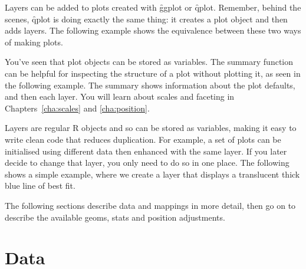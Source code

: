 Layers can be added to plots created with \f{ggplot} or \f{qplot}.  Remember, behind the scenes, \f{qplot} is doing exactly the same thing: it creates a plot object and then adds layers.  The following example shows the equivalence between these two ways of making plots.

% 
% 


You've seen that plot objects can be stored as variables. The summary function can be helpful for inspecting the structure of a plot without plotting it, as seen in the following example.  The summary shows information about the plot defaults, and then each layer. You will learn about scales and faceting in Chapters~\ref{cha:scales} and \ref{cha:position}.

%
%


Layers are regular R objects and so can be stored as variables, making it easy to write clean code that reduces duplication.  For example, a set of plots can be initialised using different data then enhanced with the same layer.  If you later decide to change that layer, you only need to do so in one place.  The following shows a simple example, where we create a layer that displays a translucent thick blue line of best fit.

% 


The following sections describe data and mappings in more detail, then go on to describe the available geoms, stats and position adjustments.

\section{Data}
\label{sec:data}

